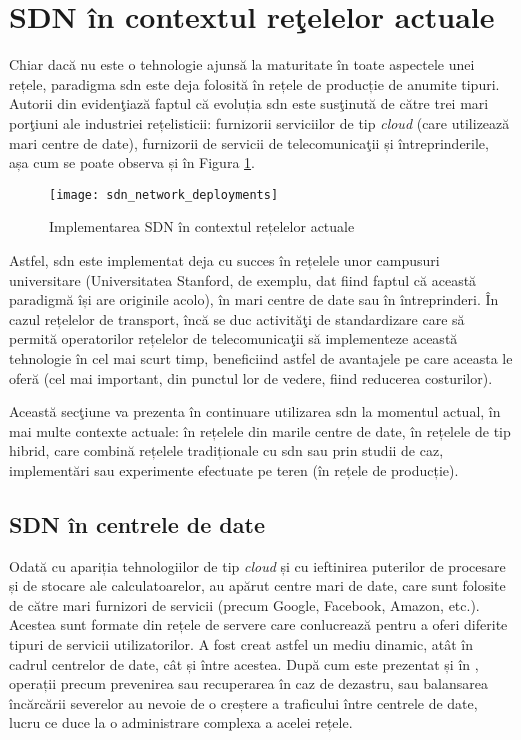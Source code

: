 \section{SDN în contextul reţelelor actuale}

Chiar dacă nu este o tehnologie ajunsă la maturitate în toate aspectele unei rețele, paradigma \gls{sdn} este deja folosită în rețele de producție de anumite tipuri. Autorii din \cite{alvizu2017comprehensive} evidenţiază faptul că evoluția \gls{sdn} este susţinută de către trei mari porţiuni ale industriei rețelisticii: furnizorii serviciilor de tip \textit{cloud} (care utilizează mari centre de date), furnizorii de servicii de telecomunicaţii și întreprinderile, așa cum se poate observa și în Figura \ref{fig:sdn_network_deployments}. 

\begin{figure}[h]
	\centering
	\texttt{[image: sdn\_network\_deployments]}
	\caption{Implementarea SDN în contextul rețelelor actuale~\cite{alvizu2017comprehensive}}
	\label{fig:sdn_network_deployments}
\end{figure}

Astfel, \gls{sdn} este implementat deja cu succes în rețelele unor campusuri universitare (Universitatea Stanford, de exemplu, dat fiind faptul că această paradigmă își are originile acolo), în mari centre de date sau în întreprinderi. În cazul rețelelor de transport, încă se duc activităţi de standardizare care să permită operatorilor rețelelor de telecomunicaţii să implementeze această tehnologie în cel mai scurt timp, beneficiind astfel de avantajele pe care aceasta le oferă (cel mai important, din punctul lor de vedere, fiind reducerea costurilor).

Această secţiune va prezenta în continuare utilizarea \gls{sdn} la momentul actual, în mai multe contexte actuale: în rețelele din marile centre de date, în rețelele de tip hibrid, care combină rețelele tradiționale cu \gls{sdn} sau prin studii de caz, implementări sau experimente efectuate pe teren (în rețele de producție).

\subsection{SDN în centrele de date}

Odată cu apariția tehnologiilor de tip \textit{cloud} și cu ieftinirea puterilor de procesare și de stocare ale calculatoarelor, au apărut centre mari de date, care sunt folosite de către mari furnizori de servicii (precum Google, Facebook, Amazon, etc.). Acestea sunt formate din rețele de servere care conlucrează pentru a oferi diferite tipuri de servicii utilizatorilor. A fost creat astfel un mediu dinamic, atât în cadrul centrelor de date, cât și între acestea. După cum este prezentat și în \cite{onf_openflow_backbone2012}, operații precum prevenirea sau recuperarea în caz de dezastru, sau balansarea încărcării severelor au nevoie de o creștere a traficului între centrele de date, lucru ce duce la o administrare complexa a acelei rețele.

